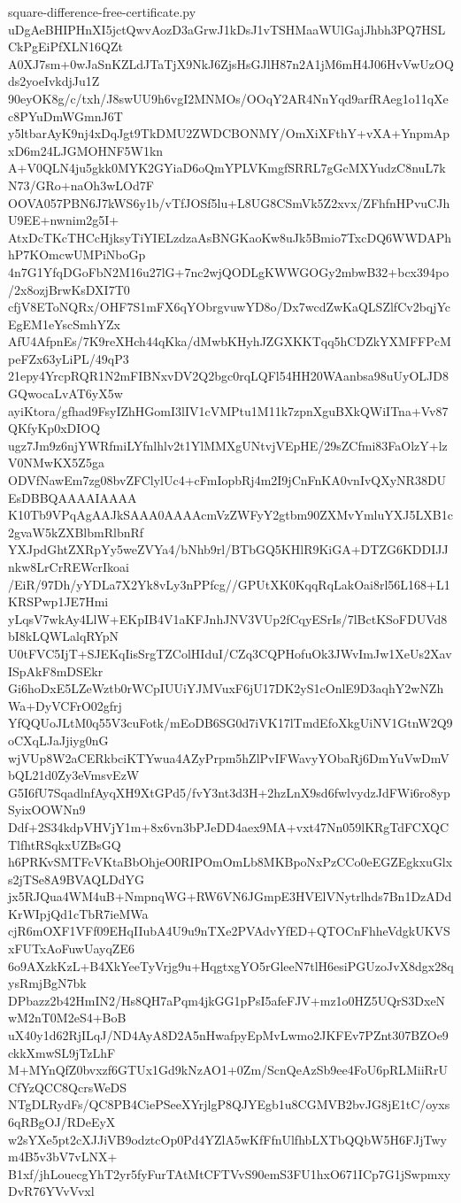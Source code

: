 \documentclass[11pt]{article}
\theoremstyle{definition}
\theoremstyle{remark}
\begin{document}
\begin{filecontents*}[overwrite]{square-difference-free-certificate.py}
uDgAeBHIPHnXI5jctQwvAozD3aGrwJ1kDsJ1vTSHMaaWUlGajJhbh3PQ7HSLCkPgEiPfXLN16QZt
A0XJ7sm+0wJaSnKZLdJTaTjX9NkJ6ZjsHsGJlH87n2A1jM6mH4J06HvVwUzOQds2yoeIvkdjJu1Z
90eyOK8g/c/txh/J8swUU9h6vgI2MNMOs/OOqY2AR4NnYqd9arfRAeg1o11qXec8PYuDmWGmnJ6T
y5ltbarAyK9nj4xDqJgt9TkDMU2ZWDCBONMY/OmXiXFthY+vXA+YnpmApxD6m24LJGMOHNF5W1kn
A+V0QLN4ju5gkk0MYK2GYiaD6oQmYPLVKmgfSRRL7gGcMXYudzC8nuL7kN73/GRo+naOh3wLOd7F
OOVA057PBN6J7kWS6y1b/vTfJOSf5lu+L8UG8CSmVk5Z2xvx/ZFhfnHPvuCJhU9EE+nwnim2g5I+
AtxDcTKcTHCcHjksyTiYIELzdzaAsBNGKaoKw8uJk5Bmio7TxcDQ6WWDAPhhP7KOmcwUMPiNboGp
4n7G1YfqDGoFbN2M16u27lG+7nc2wjQODLgKWWGOGy2mbwB32+bcx394po/2x8ozjBrwKsDXI7T0
cfjV8EToNQRx/OHF7S1mFX6qYObrgvuwYD8o/Dx7wcdZwKaQLSZlfCv2bqjYcEgEM1eYscSmhYZx
AfU4AfpnEs/7K9reXHch44qKka/dMwbKHyhJZGXKKTqq5hCDZkYXMFFPcMpeFZx63yLiPL/49qP3
21epy4YrcpRQR1N2mFIBNxvDV2Q2bgc0rqLQFl54HH20WAanbsa98uUyOLJD8GQwocaLvAT6yX5w
ayiKtora/gfhad9FsyIZhHGomI3lIV1cVMPtu1M11k7zpnXguBXkQWiITna+Vv87QKfyKp0xDIOQ
ugz7Jm9z6njYWRfmiLYfnlhlv2t1YlMMXgUNtvjVEpHE/29sZCfmi83FaOlzY+lzV0NMwKX5Z5ga
ODVfNawEm7zg08bvZFClylUc4+cFmIopbRj4m2I9jCnFnKA0vnIvQXyNR38DUEsDBBQAAAAIAAAA
K10Tb9VPqAgAAJkSAAA0AAAAcmVzZWFyY2gtbm90ZXMvYmluYXJ5LXB1c2gvaW5kZXBlbmRlbnRf
YXJpdGhtZXRpYy5weZVYa4/bNhb9rl/BTbGQ5KHlR9KiGA+DTZG6KDDIJJnkw8LrCrREWcrIkoai
/EiR/97Dh/yYDLa7X2Yk8vLy3nPPfcg//GPUtXK0KqqRqLakOai8rl56L168+L1KRSPwp1JE7Hmi
yLqsV7wkAy4LlW+EKpIB4V1aKFJnhJNV3VUp2fCqyESrIs/7lBctKSoFDUVd8bI8kLQWLalqRYpN
U0tFVC5IjT+SJEKqIisSrgTZColHIduI/CZq3CQPHofuOk3JWvImJw1XeUs2XavISpAkF8mDSEkr
Gi6hoDxE5LZeWztb0rWCpIUUiYJMVuxF6jU17DK2yS1cOnlE9D3aqhY2wNZhWa+DyVCFrO02gfrj
YfQQUoJLtM0q55V3cuFotk/mEoDB6SG0d7iVK17lTmdEfoXkgUiNV1GtnW2Q9oCXqLJaJjiyg0nG
wjVUp8W2aCERkbciKTYwua4AZyPrpm5hZlPvIFWavyYObaRj6DmYuVwDmVbQL21d0Zy3eVmsvEzW
G5I6fU7SqadlnfAyqXH9XtGPd5/fvY3nt3d3H+2hzLnX9sd6fwlvydzJdFWi6ro8ypSyixOOWNn9
Ddf+2S34kdpVHVjY1m+8x6vn3bPJeDD4aex9MA+vxt47Nn059lKRgTdFCXQCTlfhtRSqkxUZBsGQ
h6PRKvSMTFcVKtaBbOhjeO0RIPOmOmLb8MKBpoNxPzCCo0eEGZEgkxuGlxs2jTSe8A9BVAQLDdYG
jx5RJQua4WM4uB+NmpnqWG+RW6VN6JGmpE3HVElVNytrlhds7Bn1DzADdKrWIpjQd1cTbR7ieMWa
cjR6mOXF1VFf09EHqIIubA4U9u9nTXe2PVAdvYfED+QTOCnFhheVdgkUKVSxFUTxAoFuwUayqZE6
6o9AXzkKzL+B4XkYeeTyVrjg9u+HqgtxgYO5rGleeN7tlH6esiPGUzoJvX8dgx28qysRmjBgN7bk
DPbazz2b42HmIN2/Hs8QH7aPqm4jkGG1pPsI5afeFJV+mz1o0HZ5UQrS3DxeNwM2nT0M2eS4+BoB
uX40y1d62RjILqJ/ND4AyA8D2A5nHwafpyEpMvLwmo2JKFEv7PZnt307BZOe9ckkXmwSL9jTzLhF
M+MYnQfZ0bvxzf6GTUx1Gd9kNzAO1+0Zm/ScnQeAzSb9ee4FoU6pRLMiiRrUCfYzQCC8QcrsWeDS
NTgDLRydFs/QC8PB4CiePSeeXYrjlgP8QJYEgb1u8CGMVB2bvJG8jE1tC/oyxs6qRBgOJ/RDeEyX
w2sYXe5pt2cXJJiVB9odztcOp0Pd4YZlA5wKfFfnUlfhbLXTbQQbW5H6FJjTwym4B5v3bV7vLNX+
B1xf/jhLouecgYhT2yr5fyFurTAtMtCFTVvS90emS3FU1hxO671ICp7G1jSwpmxyDvR76YVvVvxl

\end{filecontents*}
\end{document}

